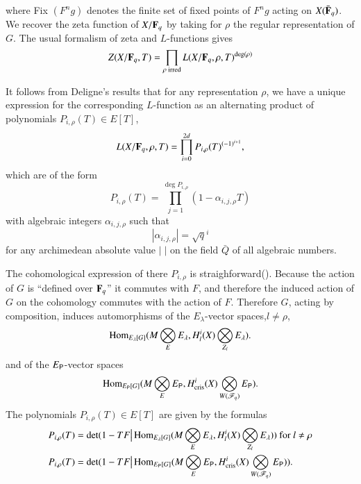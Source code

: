\eject
\noindent
where Fix $(F^n g)$ denotes the finite set of fixed points of $F^ng$ acting on $X(\bar{\mathbf{F}}_q)$. We recover the zeta function of $X/\mathbf{F}_q$ by taking for $\rho$ the regular representation of $G$. The usual formalism of zeta and $L$-functions gives 
$$
Z(X/ \mathbf{F}_q, T) = \prod\limits_{\rho \text{ irred}} L (X / \mathbf{F}_q, \rho, T)^{\deg (\rho)}
$$

It follows from Deligne's results that for any representation $\rho$, we have a unique expression for the corresponding $L$-function as an alternating product of polynomials $P_{i,\rho}(T) \in E [T]$,
$$
L(X/ \mathbf{F}_{q}, \rho, T) =\prod\limits^{2d}_{i=0} P_{i,\rho} (T)^{(-1)^{i+1}},
$$
which are of the form 
$$
P_{i,\rho} (T) = \prod\limits^{\deg P_{i,\rho}}_{j=1} (1 - \alpha_{i, j, \rho} T)
$$
with algebraic integers $\alpha_{i, j,\rho}$ such that 
$$
|\alpha_{i, j, \rho}| = \sqrt{q}^i
$$
for any archimedean absolute value $|\;|$ on the field $\bar{Q}$ of all algebraic numbers. 

The cohomological expression of there $P_{i,\rho}$ is straighforward\break  (\cf\cite{art6-key18}). Because the action of $G$ is ``defined over $\mathbf{F}_q$'' it commutes with $F$, and therefore the induced action of $G$ on the cohomology commutes with the action of $F$. Therefore $G$, acting by composition, induces automorphisms of the $E_\lambda$-vector spaces,$l \neq \rho$,
$$
\operatorname{Hom}_{E_\lambda [G]} (M\bigotimes\limits_E E_\lambda, H^i_l (X) \bigotimes\limits_{Z_l} E_\lambda).
$$
and of the $E_{\mathsf{P}}$-vector spaces
$$
\operatorname{Hom}_{E_{\mathsf{P}} [G]} (M \bigotimes\limits_{E} E_{\mathsf{P}}, H^i_{\text{cris}} (X) \bigotimes\limits_{W(\mathscr{F}_q)} E_{\mathsf{P}}). 
$$
The polynomials $P_{i, \rho} (T) \in E [T]$ are given by the formulas 
\begin{align*}
P_{i,\rho} (T) & = \det (1 - T F \big| \operatorname{Hom}_{E_\lambda [G]} (M \bigotimes\limits_{E} E_\lambda, H^i_l (X) \bigotimes\limits_{Z_l} E_\lambda )) \text{ for } l \neq \rho \\
P_{i, \rho} (T) & = \det (1 - TF \big| \operatorname{Hom}_{E_{\mathsf{P}} [G]} (M\bigotimes\limits_E E_{\mathsf{P}}, H^i_{\text{cris}} (X) \bigotimes\limits_{W (\mathscr{F}_q)} E_{\mathsf{P}})).
\end{align*}

